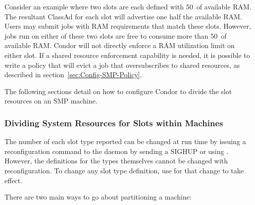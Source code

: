 Consider an example where two slots are each defined with 50\Percent\ 
of available RAM.  
The resultant ClassAd for each slot will advertise one half the available RAM.
Users may submit jobs with RAM requirements that match these slots.
However, jobs run on either of these two slots are free to
consume more than 50\Percent\ of available RAM.  
Condor will not directly enforce a RAM utilization limit on either slot.
If a shared resource enforcement capability is needed, 
it is possible to write a  policy that will evict 
a job that oversubscribes to shared resources, 
as described in section~\ref{sec:Config-SMP-Policy}.

The following sections detail on how to configure Condor to
divide the slot resources on an SMP machine.

\subsubsection{\label{sec:SMP-Divide}
Dividing System Resources for Slots within Machines}
\index{partitioning SMP machines}

The number of each slot type
reported can be changed at run time by issuing a reconfiguration
command to
the  daemon by sending a SIGHUP or using .
However, the definitions for the types themselves cannot be changed
with reconfiguration.
To change any slot type definition, use 
for that change to take effect.

There are two main ways to go about partitioning a machine:

